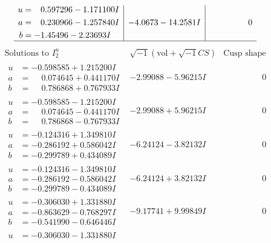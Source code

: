 \documentclass[1p]{elsarticle_modified}
\theoremstyle{definition}
\newcommand{\I}{\sqrt{-1}}
\begin{document}
$$\begin{array}{c|c|c}
\begin{aligned}
u &= \phantom{-}0.597296 - 1.171100 I \\
a &= \phantom{-}0.230966 - 1.257840 I \\
b &= -1.45496 - 2.23693 I\end{aligned}
 & -4.0673 - 14.2581 I & \phantom{-0.000000 } 0\\
 \hline 
 \end{array}$$\newpage$$\begin{array}{c|c|c}  
\text{Solutions to }I^u_{2}& \I (\text{vol} + \sqrt{-1}CS) & \text{Cusp shape}\\
 \hline 
\begin{aligned}
u &= -0.598585 + 1.215200 I \\
a &= \phantom{-}0.074645 + 0.441170 I \\
b &= \phantom{-}0.786868 + 0.767933 I\end{aligned}
 & -2.99088 - 5.96215 I & \phantom{-0.000000 } 0 \\ \hline\begin{aligned}
u &= -0.598585 - 1.215200 I \\
a &= \phantom{-}0.074645 - 0.441170 I \\
b &= \phantom{-}0.786868 - 0.767933 I\end{aligned}
 & -2.99088 + 5.96215 I & \phantom{-0.000000 } 0 \\ \hline\begin{aligned}
u &= -0.124316 + 1.349810 I \\
a &= -0.286192 + 0.586042 I \\
b &= -0.299789 + 0.434089 I\end{aligned}
 & -6.24124 - 3.82132 I & \phantom{-0.000000 } 0 \\ \hline\begin{aligned}
u &= -0.124316 - 1.349810 I \\
a &= -0.286192 - 0.586042 I \\
b &= -0.299789 - 0.434089 I\end{aligned}
 & -6.24124 + 3.82132 I & \phantom{-0.000000 } 0 \\ \hline\begin{aligned}
u &= -0.306030 + 1.331880 I \\
a &= -0.863629 - 0.768297 I \\
b &= -0.541990 - 0.646446 I\end{aligned}
 & -9.17741 + 9.99849 I & \phantom{-0.000000 } 0 \\ \hline\begin{aligned}
u &= -0.306030 - 1.331880 I \\

\end{aligned}
\end{array}$$
\end{document}

